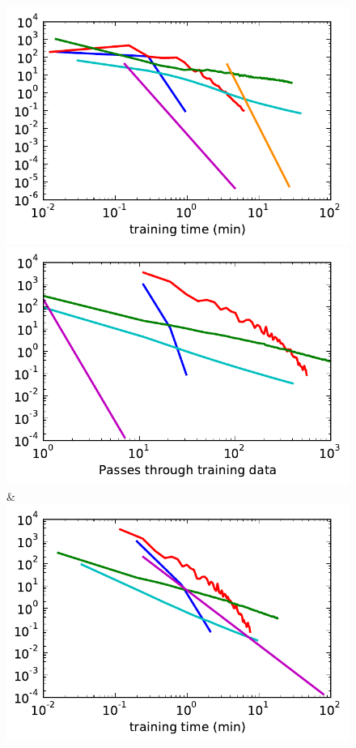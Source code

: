 \begin{figure}
\begin{tabu}
    \includegraphics[width=\linewidth]{evaluation/images/scene_full_log_time}\\
    \includegraphics[width=\linewidth]{evaluation/images/yeast_tree_log}&%
    \includegraphics[width=\linewidth]{evaluation/images/yeast_tree_log_time}\\

\end{tabu}
\end{figure}
